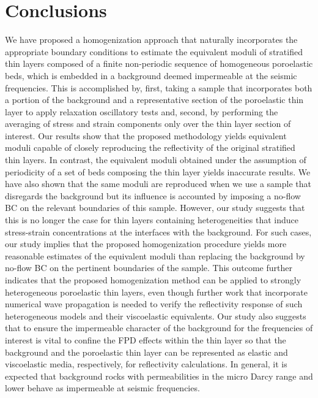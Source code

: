 \documentclass[draft]{agujournal2019}
\begin{document}
\section{Conclusions}
We have proposed a homogenization approach that naturally incorporates the appropriate boundary conditions to estimate the equivalent moduli of stratified thin layers composed of a finite non-periodic sequence of homogeneous poroelastic beds, which is embedded in a background deemed impermeable at the seismic frequencies.
This is accomplished by, first, taking a sample that incorporates both a portion of the background and a representative section of the poroelastic thin layer to apply relaxation oscillatory tests and, second, by performing the averaging of stress and strain components only over the thin layer section of interest.
Our results show that the proposed methodology yields equivalent moduli capable of closely reproducing the reflectivity of the original stratified thin layers. In contrast, the equivalent moduli obtained under the assumption of periodicity of a set of beds composing the thin layer yields inaccurate results. We  have also shown that the same moduli are reproduced when we use a sample that disregards the background but its influence is accounted by imposing a no-flow BC on the relevant boundaries of this sample. However, our study suggests that this is no longer the case for thin layers containing heterogeneities that induce stress-strain concentrations at the interfaces with the background. For such cases, our study implies that the proposed homogenization procedure yields more reasonable estimates of the equivalent moduli than replacing the background by no-flow BC on the pertinent boundaries of the sample. This outcome further indicates that the proposed homogenization method can be applied to strongly heterogeneous poroelastic thin layers, even though further work that incorporate numerical wave propagation is needed to verify the reflectivity response of such heterogeneous models and their viscoelastic equivalents. Our study also suggests that to ensure the impermeable character
of the background for the frequencies of interest is vital to confine the FPD effects within the thin layer so that the background and the poroelastic thin layer can be represented as elastic and viscoelastic media, respectively, for reflectivity calculations. In general, it is expected that background rocks with permeabilities in the micro Darcy range and lower behave as impermeable at seismic frequencies.
\end{document}

